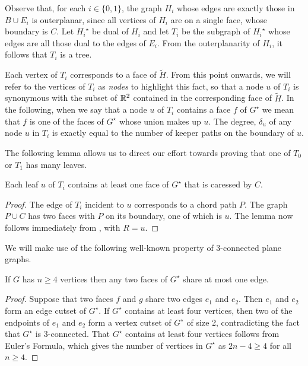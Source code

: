 \documentclass{patmorin}
\newcommand{\dual}[1]{{#1}^\star}
\begin{document}
Observe that, for each $i\in\{0,1\}$, the graph $H_i$ whose edges are
exactly those in $B\cup E_i$ is outerplanar, since all vertices of $H_i$
are on a single face, whose boundary is $C$.  Let $\dual{H_i}$ be dual
of $H_i$ and let $T_i$ be the subgraph of $\dual{H_i}$ whose edges are
all those dual to the edges of $E_i$. From the outerplanarity of $H_i$,
it follows that $T_i$ is a tree.

Each vertex of $T_i$ corresponds to a face of $\tilde{H}$.  From this
point onwards, we will refer to the vertices of $T_i$ as \emph{nodes}
to highlight this fact, so that a node $u$ of $T_i$ is synonymous with
the subset of $\mathbb{R}^2$ contained in the corresponding face of $\tilde{H}$.
In the following, when we say that a node $u$ of $T_i$ contains a face $f$
of $\dual{G}$ we mean that $f$ is one of the faces of $\dual{G}$ whose
union makes up $u$.  The degree, $\delta_u$ of any node $u$ in $T_i$
is exactly equal to the number of keeper paths on the boundary of $u$.


The following lemma allows us to direct our effort towards proving that
one of $T_0$ or $T_1$ has many leaves.

\begin{lem}
   Each leaf $u$ of $T_i$ contains at least one face of $\dual{G}$
   that is caressed by $C$.
\end{lem}

\begin{proof}
   The edge of $T_i$ incident to $u$ corresponds to a chord path $P$. The
   graph $P\cup C$ has two faces with $P$ on its boundary, one of which
   is $u$.  The lemma now follows immediately from ,
   with $R=u$.
\end{proof}

We will make use of the following well-known property of
3-connected plane graphs.

\begin{lem}
   If $G$ has $n\ge 4$ vertices then any two faces of $\dual{G}$ share at
   most one edge.
\end{lem}

\begin{proof}
   Suppose that two faces $f$ and $g$ share two edges $e_1$ and
   $e_2$. Then $e_1$ and $e_2$ form an edge cutset of $\dual{G}$.
   If $\dual{G}$ contains at least four vertices, then two of the
   endpoints of $e_1$ and $e_2$ form a vertex cutset of $\dual{G}$
   of size 2, contradicting the fact that $\dual{G}$ is 3-connected.
   That $\dual{G}$ contains at least four vertices follows from Euler's
   Formula, which gives the number of vertices in $\dual{G}$ as $2n-4\ge
   4$ for all $n\ge 4$.
\end{proof}
\end{document}
